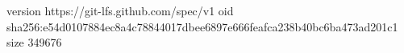 version https://git-lfs.github.com/spec/v1
oid sha256:e54d0107884ec8a4c78844017dbee6897e666feafca238b40bc6ba473ad201c1
size 349676
